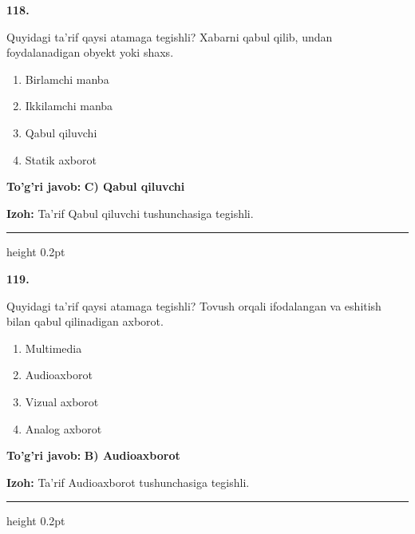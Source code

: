 \documentclass[10pt,a4paper,oneside]{article}
\begin{document}
\noindent\textbf{\color{ink}118.}
\par
Quyidagi ta'rif qaysi atamaga tegishli? Xabarni qabul qilib, undan foydalanadigan obyekt yoki shaxs.
\begin{enumerate}[label=\Alph*),leftmargin=9mm]
\item Birlamchi manba
\item Ikkilamchi manba
\item Qabul qiluvchi
\item Statik axborot
\end{enumerate}
\begin{tcolorbox}[enhanced,breakable,colback=teal!4,colframe=teal!50!black,boxrule=0.5pt,arc=1.1mm,left=3mm,right=3mm,top=1.7mm,bottom=1.7mm,before skip=2mm,after skip=2mm]
\textbf{\color{teal}To'g'ri javob:} \textbf{C) Qabul qiluvchi}
\par\smallskip
\textbf{Izoh:} Ta'rif Qabul qiluvchi tushunchasiga tegishli.
\end{tcolorbox}
\vspace{2mm}\hrule height 0.2pt \vspace{3mm}

\noindent\textbf{\color{ink}119.}
\par
Quyidagi ta'rif qaysi atamaga tegishli? Tovush orqali ifodalangan va eshitish bilan qabul qilinadigan axborot.
\begin{enumerate}[label=\Alph*),leftmargin=9mm]
\item Multimedia
\item Audioaxborot
\item Vizual axborot
\item Analog axborot
\end{enumerate}
\begin{tcolorbox}[enhanced,breakable,colback=teal!4,colframe=teal!50!black,boxrule=0.5pt,arc=1.1mm,left=3mm,right=3mm,top=1.7mm,bottom=1.7mm,before skip=2mm,after skip=2mm]
\textbf{\color{teal}To'g'ri javob:} \textbf{B) Audioaxborot}
\par\smallskip
\textbf{Izoh:} Ta'rif Audioaxborot tushunchasiga tegishli.
\end{tcolorbox}
\vspace{2mm}\hrule height 0.2pt \vspace{3mm}
\end{document}
